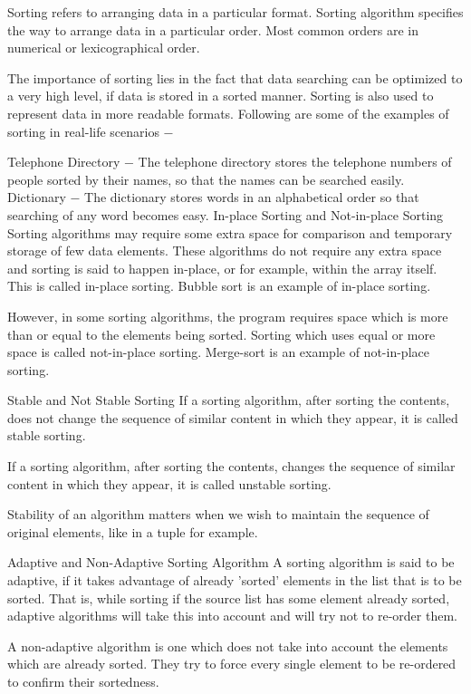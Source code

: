 Sorting refers to arranging data in a particular format. Sorting algorithm specifies the way to arrange data in a particular order. Most common orders are in numerical or lexicographical order.

The importance of sorting lies in the fact that data searching can be optimized to a very high level, if data is stored in a sorted manner. Sorting is also used to represent data in more readable formats. Following are some of the examples of sorting in real-life scenarios −

Telephone Directory − The telephone directory stores the telephone numbers of people sorted by their names, so that the names can be searched easily.
Dictionary − The dictionary stores words in an alphabetical order so that searching of any word becomes easy.
In-place Sorting and Not-in-place Sorting
Sorting algorithms may require some extra space for comparison and temporary storage of few data elements. These algorithms do not require any extra space and sorting is said to happen in-place, or for example, within the array itself. This is called in-place sorting. Bubble sort is an example of in-place sorting.

However, in some sorting algorithms, the program requires space which is more than or equal to the elements being sorted. Sorting which uses equal or more space is called not-in-place sorting. Merge-sort is an example of not-in-place sorting.

Stable and Not Stable Sorting
If a sorting algorithm, after sorting the contents, does not change the sequence of similar content in which they appear, it is called stable sorting.



If a sorting algorithm, after sorting the contents, changes the sequence of similar content in which they appear, it is called unstable sorting.



Stability of an algorithm matters when we wish to maintain the sequence of original elements, like in a tuple for example.

Adaptive and Non-Adaptive Sorting Algorithm
A sorting algorithm is said to be adaptive, if it takes advantage of already 'sorted' elements in the list that is to be sorted. That is, while sorting if the source list has some element already sorted, adaptive algorithms will take this into account and will try not to re-order them.

A non-adaptive algorithm is one which does not take into account the elements which are already sorted. They try to force every single element to be re-ordered to confirm their sortedness.

